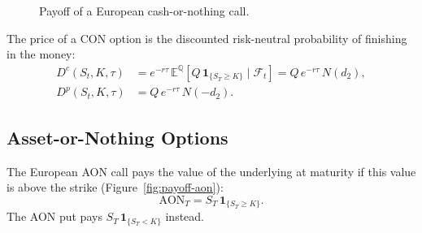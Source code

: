 \documentclass[11pt,a4paper]{article}
\theoremstyle{remark}
\newcommand{\ind}{\mathbf{1}}
\begin{document}
\begin{figure}[htbp]
\centering
{}
\caption{Payoff of a European cash-or-nothing call.}
\label{fig:payoff-con}
\end{figure}

The price of a CON option is the discounted risk-neutral probability of
finishing in the money:
\begin{align}
  D^{c}(S_t,K,\tau) &= e^{-r\tau}\,\mathbb{E}^{\mathbb{Q}}\!\left[Q\,\mathbf{1}_{\{S_T \geq K\}} \mid \mathcal{F}_t\right]
                     = Q\,e^{-r\tau}\,N(d_2), \label{eq:cash-call}\\
  D^{p}(S_t,K,\tau) &= Q\,e^{-r\tau}\,N(-d_2). \label{eq:cash-put}
\end{align}

\subsection{Asset-or-Nothing Options}
\label{subsec:aon}

The European AON call pays the value of the underlying at maturity if this
value is above the strike (Figure~\ref{fig:payoff-aon}):
\begin{equation}
  \mathrm{AON}_T = S_T\,\ind_{\{S_T \geq K\}}.
  \label{eq:aon-payoff}
\end{equation}
The AON put pays $S_T\,\ind_{\{S_T < K\}}$ instead.
\end{document}
